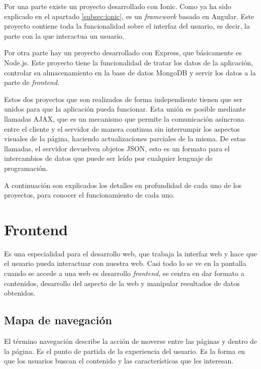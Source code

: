 \documentclass[a4paper, 12pt]{book}
\begin{document}
Por una parte existe un proyecto desarrollado con Ionic. Como ya ha sido explicado en el apartado \ref{subsec:ionic}, es un \emph{framework} basado en Angular. Este proyecto contiene toda la funcionalidad sobre el interfaz del usuario,
es decir, la parte con la que interactua un usuario.

Por otra parte hay un proyecto desarrollado con Express, que b\'asicamente es Node.js. Este proyecto tiene la funcionalidad de tratar los datos de la aplicaci\'on, controlar su almacenamiento en la base de datos MongoDB y servir los datos
a la parte de \emph{frontend}.

Estos dos proyectos que son realizados de forma independiente tienen que ser unidos para que la 
aplicaci\'on pueda funcionar. Esta uni\'on es posible mediante llamadas AJAX, que es un mecanismo que permite la comunicaci\'on as\'incrona entre el cliente y el servidor de manera continua sin interrumpir los aspectos visuales de la p\'agina, haciendo actualizaciones parciales de la misma.
De estas llamadas, el servidor devuelven objetos JSON, esto es un formato para el intercambios de datos que puede ser le\'ido por cualquier lenguaje de programaci\'on.

A continuaci\'on son explicados los detalles en profundidad de cada uno de los proyectos, para conocer el funcionamiento de cada uno.



\section{Frontend}
\label{sec:frontend}

Es una especialidad para el desarrollo web, que trabaja la interfaz web y hace que el usuario pueda interactuar con nuestra web.
Casi todo lo se ve en la pantalla cuando se accede a una web es desarrollo \emph{frontend}, se centra en dar formato a contenidos, desarrollo del aspecto de la web y manipular resultados de datos obtenidos.

\subsection{Mapa de navegaci\'on}
\label{sec:mapa_navegacion}

El t\'ermino navegaci\'on describe la acci\'on de moverse entre las p\'aginas y dentro de la p\'agina.
Es el punto de partida de la experiencia del usuario. Es la forma en que los usuarios buscan el
contenido y las caracter\'isticas que les interesan.
\end{document}
